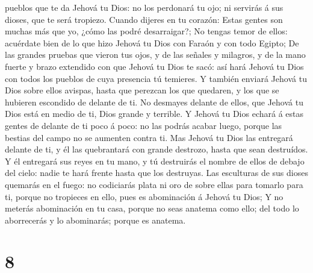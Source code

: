 pueblos que te da Jehová tu Dios: no los perdonará tu ojo; ni servirás á
sus dioses, que te será tropiezo.  Cuando dijeres en tu
corazón: Estas gentes son muchas más que yo, ¿cómo las podré
desarraigar?;  No tengas temor de ellos: acuérdate bien de
lo que hizo Jehová tu Dios con Faraón y con todo Egipto; 
De las grandes pruebas que vieron tus ojos, y de las señales y milagros,
y de la mano fuerte y brazo extendido con que Jehová tu Dios te sacó:
así hará Jehová tu Dios con todos los pueblos de cuya presencia tú
temieres.  Y también enviará Jehová tu Dios sobre ellos
avispas, hasta que perezcan los que quedaren, y los que se hubieren
escondido de delante de ti.  No desmayes delante de ellos,
que Jehová tu Dios está en medio de ti, Dios grande y terrible.
 Y Jehová tu Dios echará á estas gentes de delante de ti
poco á poco: no las podrás acabar luego, porque las bestias del campo no
se aumenten contra ti.  Mas Jehová tu Dios las entregará
delante de ti, y él las quebrantará con grande destrozo, hasta que sean
destruídos.  Y él entregará sus reyes en tu mano, y tú
destruirás el nombre de ellos de debajo del cielo: nadie te hará frente
hasta que los destruyas.  Las esculturas de sus dioses
quemarás en el fuego: no codiciarás plata ni oro de sobre ellas para
tomarlo para ti, porque no tropieces en ello, pues es abominación á
Jehová tu Dios;  Y no meterás abominación en tu casa,
porque no seas anatema como ello; del todo lo aborrecerás y lo
abominarás; porque es anatema.

\hypertarget{section-7}{%
\section{8}\label{section-7}}

